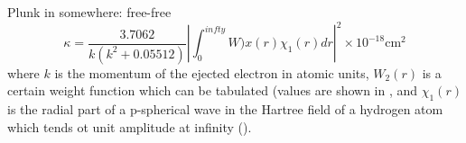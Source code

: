 Plunk in somewhere: free-free
\begin{equation}
\kappa = \frac{3.7062}{k(k^2+0.05512)}\left\lvert \int_0^{infty}W)x(r)\chi_1(r)dr \right\rvert^2 \times 10^{-18} \textrm{cm}^2
\end{equation}
where $k$ is the momentum of the ejected electron in atomic units, $W_2(r)$ is a certain weight function which can be tabulated (values are shown in \citealt{chandra1945}, and $\chi_1(r)$ is the radial part of a p-spherical wave in the Hartree field of a hydrogen atom which tends ot unit amplitude at infinity (\citealt{chandra1945}).
